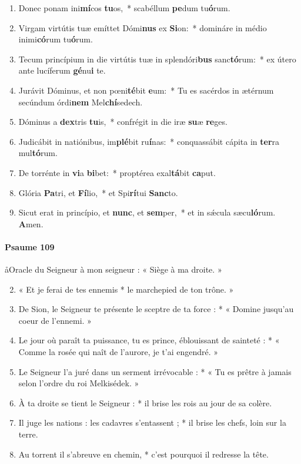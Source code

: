 \documentclass[twoside]{article}
\begin{document}
\begin{paracol}[1]{2}
\begin{enumerate}[wide, itemsep=0mm, labelwidth=!, labelindent=0pt, label=\color{gregoriocolor}\theenumi]
\setcounter{enumi}{1}
\item Donec ponam ini\textbf{mí}cos \textbf{tu}os,~* scabéllum \textbf{pe}dum tu\textbf{ó}rum.
\item Virgam virtútis tuæ emíttet Dómi\textbf{nus} ex \textbf{Si}on:~* domináre in médio inimi\textbf{có}rum tu\textbf{ó}rum.
\item Tecum princípium in die virtútis tuæ in splendóri\textbf{bus} sanc\textbf{tó}rum:~* ex útero ante lucíferum \textbf{gé}nu\textbf{i} te.
\item Jurávit Dóminus, et non pœni\textbf{té}bit \textbf{e}um:~* Tu es sacérdos in ætérnum secúndum órdi\textbf{nem} Mel\textbf{chí}sedech.
\newpage
\item Dóminus a \textbf{dex}tris \textbf{tu}is,~* confrégit in die iræ \textbf{su}æ \textbf{re}ges.
\item Judicábit in natiónibus, im\textbf{plé}bit ru\textbf{í}nas:~* conquassábit cápita in \textbf{ter}ra mul\textbf{tó}rum.
\item De torrénte in \textbf{vi}a \textbf{bi}bet:~* proptérea exal\textbf{tá}bit \textbf{ca}put.
\item Glória \textbf{Pa}tri, et \textbf{Fí}lio,~* et Spi\textbf{rí}tui \textbf{Sanc}to.
\item Sicut erat in princípio, et \textbf{nunc}, et \textbf{sem}per,~* et in sǽcula sæcu\textbf{ló}rum. \textbf{A}men.
\end{enumerate}

\switchcolumn


\paragraph{Psaume 109}
\aa Oracle du Seigneur à mon seigneur : « Siège à ma droite. »


\begin{enumerate}[wide, itemsep=0mm, labelwidth=!, labelindent=0pt, label=\color{gregoriocolor}\theenumi]
\setcounter{enumi}{1}
\item « Et je ferai de tes ennemis * le marchepied de ton trône. »
\item De Sion, le Seigneur te présente le sceptre de ta force : * « Domine jusqu'au coeur de l'ennemi. »
\item Le jour où paraît ta puissance, tu es prince, éblouissant de sainteté : * « Comme la rosée qui naît de l'aurore, je t'ai engendré. »
\item Le Seigneur l'a juré dans un serment irrévocable : * « Tu es prêtre à jamais selon l'ordre du roi Melkisédek. »
\item À ta droite se tient le Seigneur : * il brise les rois au jour de sa colère.
\item Il juge les nations : les cadavres s'entassent ; * il brise les chefs, loin sur la terre.
\item Au torrent il s'abreuve en chemin, * c'est pourquoi il redresse la tête.
\end{enumerate}


\end{paracol}
\end{document}
